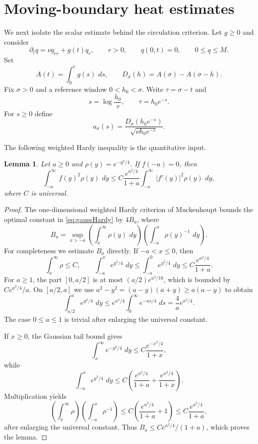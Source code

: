 \documentclass[11pt]{article}
\numberwithin{equation}{section}
\newtheorem{lemma}[lemma]{Lemma}
\theoremstyle{definition}
\newcommand{\dd}{\,d}
\begin{document}
\section{Moving-boundary heat estimates}

We next isolate the scalar estimate behind the circulation criterion.  Let $g\ge0$ and consider
\begin{equation}\label{eq:scalar}
 \partial_t q=\nu q_{rr}+g(t)q_r,
 \qquad r>0,
 \qquad q(0,t)=0,
 \qquad 0\le q\le M.
\end{equation}
Set
\[
 A(t)=\int_0^t g(s)\,\dd s,
 \qquad
 D_\sigma(h)=A(\sigma)-A(\sigma-h).
\]
Fix $\sigma>0$ and a reference window $0<h_0<\sigma$.  Write $\tau=\sigma-t$ and
\[
 s=\log\frac{h_0}{\tau},\qquad \tau=h_0e^{-s}.
\]
For $s\ge0$ define
\begin{equation}\label{eq:a-def}
 a_\sigma(s)=\frac{D_\sigma(h_0e^{-s})}{\sqrt{\nu h_0e^{-s}}}.
\end{equation}

The following weighted Hardy inequality is the quantitative input.

\begin{lemma}\label{lem:gaussHardy}
Let $a\ge0$ and $\rho(y)=e^{-y^2/4}$.  If $f(-a)=0$, then
\begin{equation}\label{eq:gaussHardy}
 \int_{-a}^{\infty}f(y)^2\rho(y)\,\dd y
 \le C\frac{e^{a^2/4}}{1+a}
 \int_{-a}^{\infty}|f'(y)|^2\rho(y)\,\dd y,
\end{equation}
where $C$ is universal.
\end{lemma}

\begin{proof}
The one-dimensional weighted Hardy criterion of Muckenhoupt \cite{Muckenhoupt1972} bounds the optimal constant in \eqref{eq:gaussHardy} by $4B_a$, where
\[
 B_a=\sup_{x>-a}
 \left(\int_x^\infty\rho(y)\,\dd y\right)
 \left(\int_{-a}^x\rho(y)^{-1}\,\dd y\right).
\]
For completeness we estimate $B_a$ directly.  If $-a<x\le0$, then
\[
 \int_x^\infty\rho\le C,
 \qquad
 \int_{-a}^x e^{y^2/4}\,\dd y
 \le\int_{-a}^0e^{y^2/4}\,\dd y
 \le C\frac{e^{a^2/4}}{1+a}.
\]
For $a\ge1$, the part $[0,a/2]$ is at most $(a/2)e^{a^2/16}$, which is bounded by $Ce^{a^2/4}/a$.  On $[a/2,a]$ we use
$a^2-y^2=(a-y)(a+y)\ge a(a-y)$ to obtain
\[
 \int_{a/2}^{a}e^{y^2/4}\,\dd y
 \le e^{a^2/4}\int_0^\infty e^{-as/4}\,\dd s
 =\frac4a e^{a^2/4}.
\]
The case $0\le a\le1$ is trivial after enlarging the universal constant.

If $x\ge0$, the Gaussian tail bound gives
\[
 \int_x^\infty e^{-y^2/4}\,\dd y
 \le C\frac{e^{-x^2/4}}{1+x},
\]
while
\[
 \int_{-a}^x e^{y^2/4}\,\dd y
 \le C\left(
 \frac{e^{a^2/4}}{1+a}+\frac{e^{x^2/4}}{1+x}
 \right).
\]
Multiplication yields
\[
 \left(\int_x^\infty\rho\right)
 \left(\int_{-a}^x\rho^{-1}\right)
 \le C\left(
 \frac{e^{a^2/4}}{1+a}+1
 \right)
 \le C\frac{e^{a^2/4}}{1+a},
\]
after enlarging the universal constant.  Thus $B_a\le C e^{a^2/4}/(1+a)$, which proves the lemma.
\end{proof}
\end{document}
